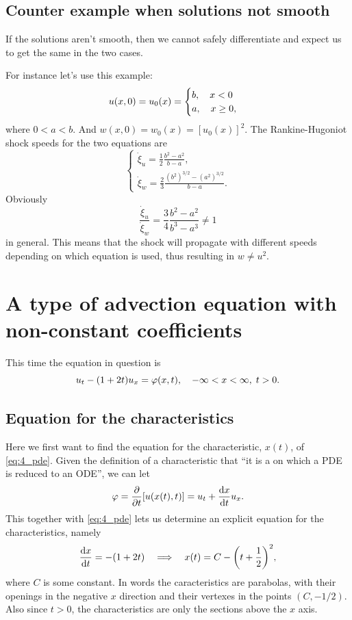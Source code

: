 \documentclass[11pt,letter, swedish, english
]{article}
\begin{document}
\subsection{Counter example when solutions not smooth}
If the solutions aren't smooth, then we cannot safely differentiate
and expect us to get the same in the two cases. 

For instance let's use this example:
\begin{equation}
u(x, 0) = u_0(x) =
\begin{cases}
b\qcomma x<0\\
a\qcomma x\ge0,
\end{cases}
\end{equation}
where $0<a<b$. And $w(x, 0) = w_0(x) = [u_0(x)]^2$. The
Rankine-Hugoniot shock speeds for the two equations are
\begin{equation}
\begin{cases}
\dot\xi_u = \frac{1}{2}\frac{b^2-a^2}{b-a},\\
\dot\xi_w = \frac{2}{3}\frac{(b^2)^{3/2}-(a^2)^{3/2}}{b-a}.
\end{cases}
\end{equation}
Obviously
\begin{equation}
\frac{\dot\xi_u}{\dot\xi_w}=\frac{3}{4}\frac{b^2-a^2}{b^{3}-a^{3}} 
\neq1
\end{equation}
in general. 
This means that the shock will propagate with different speeds
depending on which equation is used, thus resulting in $w\neq u^2$.
 

\section{A type of advection equation with non-constant coefficients}
This time the equation in question is
\begin{equation}\label{eq:4_pde}
u_t - (1+2t)u_x = \varphi(x, t)\qcomma
-\infty<x<\infty,\; t>0.
\end{equation}

\subsection{Equation for the characteristics}
Here we first want to find the equation for the characteristic,
$x(t)$, of \eqref{eq:4_pde}. Given the definition of a characteristic
that ``it is a on which a PDE is reduced to an ODE'', we can let
\begin{equation}
\varphi = \pdv{t}\qty[u(x(t), t)] = u_t + \dv{x}{t}u_x.
\end{equation}
This together with \eqref{eq:4_pde} lets us determine an explicit
equation for the characteristics, namely
\begin{equation}\label{eq:4_char}
\dv{x}{t} = - (1+2t)
\quad\Longrightarrow\quad
x(t) = C - \qty(t + \frac{1}{2})^2,
\end{equation}
where $C$ is some constant. In words the caracteristics are parabolas,
with their openings in the negative $x$ direction and their vertexes
in the points $(C, -1/2)$. Also since $t>0$, the characteristics are
only the sections above the $x$ axis. 
\end{document}
